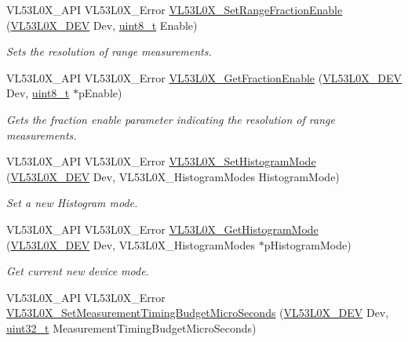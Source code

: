 \begin{DoxyCompactItemize}
V\+L53\+L0\+X\+\_\+\+A\+PI V\+L53\+L0\+X\+\_\+\+Error \hyperlink{group__VL53L0X__parameters__group_ga8efed262abe1ceff56edf7b3faa9bd86}{V\+L53\+L0\+X\+\_\+\+Set\+Range\+Fraction\+Enable} (\hyperlink{group__VL53L0X__platform__group_ga2d6405308b1dd524b462f1b8fb97d167}{V\+L53\+L0\+X\+\_\+\+D\+EV} Dev, \hyperlink{vl53l0x__types_8h_aba7bc1797add20fe3efdf37ced1182c5}{uint8\+\_\+t} Enable)
\begin{DoxyCompactList}\small\item\em Sets the resolution of range measurements. \end{DoxyCompactList}\item 
V\+L53\+L0\+X\+\_\+\+A\+PI V\+L53\+L0\+X\+\_\+\+Error \hyperlink{group__VL53L0X__parameters__group_gac339a9c68d173fda1319a98f17cba09c}{V\+L53\+L0\+X\+\_\+\+Get\+Fraction\+Enable} (\hyperlink{group__VL53L0X__platform__group_ga2d6405308b1dd524b462f1b8fb97d167}{V\+L53\+L0\+X\+\_\+\+D\+EV} Dev, \hyperlink{vl53l0x__types_8h_aba7bc1797add20fe3efdf37ced1182c5}{uint8\+\_\+t} $\ast$p\+Enable)
\begin{DoxyCompactList}\small\item\em Gets the fraction enable parameter indicating the resolution of range measurements. \end{DoxyCompactList}\item 
V\+L53\+L0\+X\+\_\+\+A\+PI V\+L53\+L0\+X\+\_\+\+Error \hyperlink{group__VL53L0X__parameters__group_ga6895ba3bdaff31cbce0f1dc2691eacd7}{V\+L53\+L0\+X\+\_\+\+Set\+Histogram\+Mode} (\hyperlink{group__VL53L0X__platform__group_ga2d6405308b1dd524b462f1b8fb97d167}{V\+L53\+L0\+X\+\_\+\+D\+EV} Dev, V\+L53\+L0\+X\+\_\+\+Histogram\+Modes Histogram\+Mode)
\begin{DoxyCompactList}\small\item\em Set a new Histogram mode. \end{DoxyCompactList}\item 
V\+L53\+L0\+X\+\_\+\+A\+PI V\+L53\+L0\+X\+\_\+\+Error \hyperlink{group__VL53L0X__parameters__group_gaea90e545569556a6e2f6e0bc3e3b92dd}{V\+L53\+L0\+X\+\_\+\+Get\+Histogram\+Mode} (\hyperlink{group__VL53L0X__platform__group_ga2d6405308b1dd524b462f1b8fb97d167}{V\+L53\+L0\+X\+\_\+\+D\+EV} Dev, V\+L53\+L0\+X\+\_\+\+Histogram\+Modes $\ast$p\+Histogram\+Mode)
\begin{DoxyCompactList}\small\item\em Get current new device mode. \end{DoxyCompactList}\item 
V\+L53\+L0\+X\+\_\+\+A\+PI V\+L53\+L0\+X\+\_\+\+Error \hyperlink{group__VL53L0X__parameters__group_gace59208a51f53cc3ab9bf834bdd2e36f}{V\+L53\+L0\+X\+\_\+\+Set\+Measurement\+Timing\+Budget\+Micro\+Seconds} (\hyperlink{group__VL53L0X__platform__group_ga2d6405308b1dd524b462f1b8fb97d167}{V\+L53\+L0\+X\+\_\+\+D\+EV} Dev, \hyperlink{vl53l0x__types_8h_a435d1572bf3f880d55459d9805097f62}{uint32\+\_\+t} Measurement\+Timing\+Budget\+Micro\+Seconds)

\end{DoxyCompactItemize}
